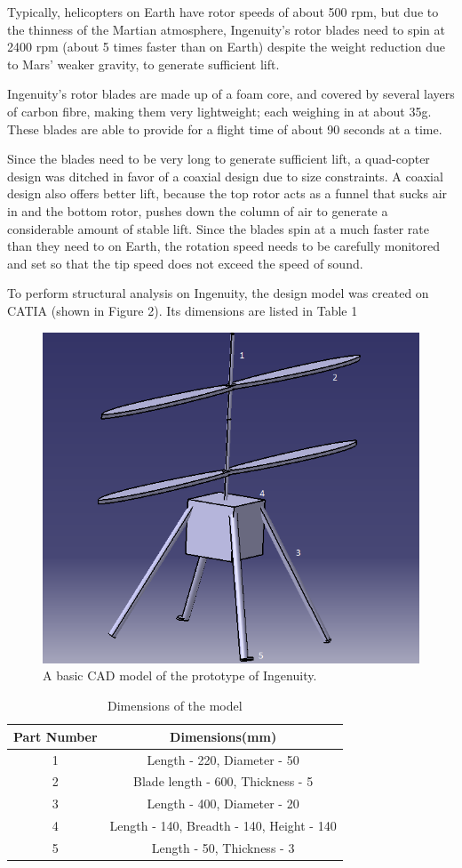 \documentclass[preprint,12pt]{elsarticle}
\begin{document}
Typically, helicopters on Earth have rotor speeds of about 500 rpm, but due to the thinness of the Martian atmosphere, Ingenuity’s rotor blades need to spin at 2400 rpm (about 5 times faster than on Earth) despite the weight reduction due to Mars’ weaker gravity, to generate sufficient lift. \par

Ingenuity’s rotor blades are made up of a foam core, and covered by several layers of carbon fibre, making them very lightweight; each weighing in at about 35g. These blades are able to provide for a flight time of about 90 seconds at a time. \par

Since the blades need to be very long to generate sufficient lift, a quad-copter design was ditched in favor of a coaxial design due to size constraints. A coaxial design also offers better lift, because the top rotor acts as a funnel that sucks air in and the bottom rotor, pushes down the column of air to generate a considerable amount of stable lift. Since the blades spin at a much faster rate than they need to on Earth, the rotation speed needs to be carefully monitored and set so that the tip speed does not exceed the speed of sound. \par

To perform structural analysis on Ingenuity, the design model was created on CATIA (shown in Figure 2). Its dimensions are listed in Table 1\par

\begin{figure}[H]
\centering\includegraphics[width=0.4\linewidth]{Ingenuity cad model.png}
\caption{A basic CAD model of the prototype of Ingenuity.}
\end{figure}


\begin{table}[H]
\centering
\begin{tabular}{c|c}
\hline
\textbf{Part Number} & \textbf{Dimensions(mm)}\\
\hline
1 & Length - 220, Diameter - 50 \\
2 & Blade length - 600, Thickness - 5 \\
3 & Length - 400, Diameter - 20\\
4 & Length - 140, Breadth - 140, Height - 140\\
5 & Length - 50, Thickness - 3\\
\hline
\end{tabular}
\caption{Dimensions of the model}
\end{table}
\end{document}
